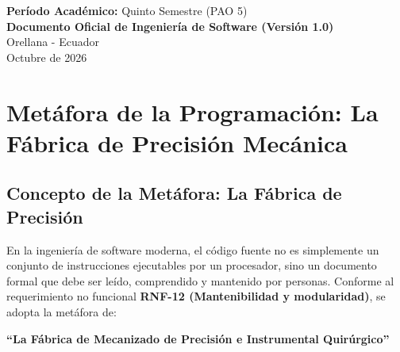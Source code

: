 \documentclass[12pt,a4paper]{report}
\begin{document}
\begin{titlepage}
  \vfill

  {\small\textbf{Período Académico:} Quinto Semestre (PAO 5)}\\[0.05cm]
  {\small\textbf{Documento Oficial de Ingeniería de Software (Versión 1.0)}}\\[0.6cm]

  {\small Orellana - Ecuador}\\[0.15cm]
  {\small Octubre de 2026}
\end{titlepage}

\tableofcontents
\newpage

\listoftables
\newpage

\chapter{Metáfora de la Programación: La Fábrica de Precisión Mecánica}

\section{Concepto de la Metáfora: La Fábrica de Precisión}
En la ingeniería de software moderna, el código fuente no es simplemente un conjunto de instrucciones ejecutables por un procesador, sino un documento formal que debe ser leído, comprendido y mantenido por personas. Conforme al requerimiento no funcional \textbf{RNF-12 (Mantenibilidad y modularidad)}, se adopta la metáfora de:
\begin{center}
  \textbf{\large ``La Fábrica de Mecanizado de Precisión e Instrumental Quirúrgico''}
\end{center}
\end{document}

